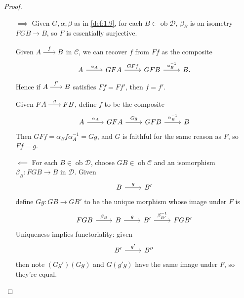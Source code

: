 \documentclass{article}
\DeclareMathOperator{\ob}{ob}
\newenvironment{tikzcdi}{\begin{tikzcd}[cramped, sep=scriptsize]}{\end{tikzcd}}
\begin{document}
\begin{proof}\leavevmode
  \begin{itemize}
    \item[$\implies$] Given $G,\alpha,\beta$ as in \cref{def:1.9}, for each $B\in\ob\mathscr{D}$, $\beta_B$ is an isometry $FGB\to B$, so $F$ is essentially surjective.

     Given $\begin{tikzcdi} A \rar{f}& B \end{tikzcdi}$ in $\mathcal{C}$, we can recover $f$ from $Ff$ as the composite
      \begin{equation*}
        \begin{tikzcd}
          A\rar{\alpha_A} & GFA\rar{GFf} &GFB\rar{\alpha_B^{-1}} & B.
        \end{tikzcd}
      \end{equation*}
      Hence if $\begin{tikzcdi} A \rar{f'}& B \end{tikzcdi}$ satisfies $Ff=Ff'$, then $f=f'$.

    Given $\begin{tikzcdi} FA \rar{g}& FB \end{tikzcdi}$, define $f$ to be the composite
      \begin{equation*}
        \begin{tikzcd}
          A\rar{\alpha_A} & GFA\rar{Gg} & GFB\rar{\alpha_B^{-1}} & B
        \end{tikzcd}
      \end{equation*}
      Then $GFf = \alpha_Bf\alpha_A^{-1} = Gg$, and $G$ is faithful for the same reason as $F$, so $Ff = g$.

    \item[$ \impliedby $] For each $B\in\ob\mathscr{D}$, choose $ GB\in\ob\mathscr{C}$ and an isomorphism $\beta_B: FGB \to B$ in $\mathscr{D}$.
      Given
      \begin{equation*}
        \begin{tikzcd}
          B\rar{g} & B'
        \end{tikzcd}
      \end{equation*}
      define $Gg: GB \to GB'$ to be the unique morphism whose image under $F$ is
      \begin{equation*}
        \begin{tikzcd}
          FGB\rar{\beta_B} & B\rar{g} & B'\rar{\beta_{B'}^{-1}} & FGB'
        \end{tikzcd}
      \end{equation*}
      Uniqueness implies functoriality: given
      \begin{equation*}
        \begin{tikzcd}
          B'\rar{g'} & B''
        \end{tikzcd}
      \end{equation*}
      then note $(Gg')(Gg)$ and $G(g' g)$ have the same image under $F$, so they're equal.


\end{itemize}
\end{proof}
\end{document}
